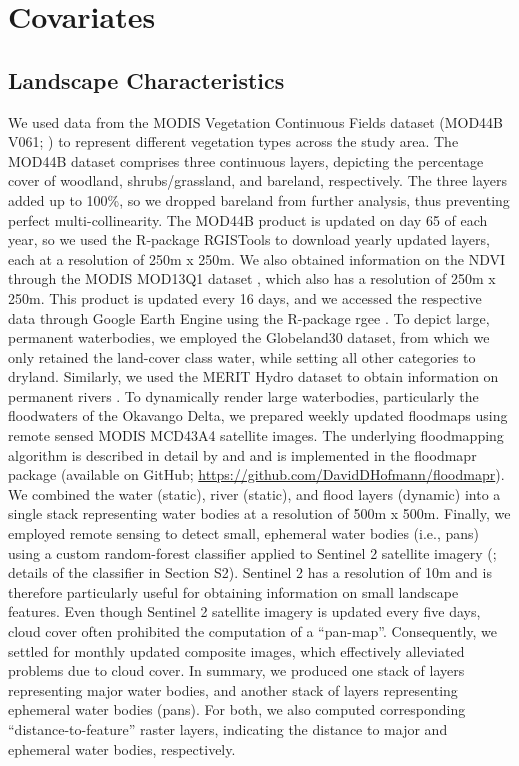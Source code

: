 \documentclass[abstract=on,10pt,a4paper,bibliography=totocnumbered]{article}
\begin{document}
\newpage
\section{Covariates}
\subsection{Landscape Characteristics}

We used data from the MODIS Vegetation Continuous Fields dataset (MOD44B V061;
\citealp{DiMiceli.2022}) to represent different vegetation types across the
study area. The MOD44B dataset comprises three continuous layers, depicting the
percentage cover of woodland, shrubs/grassland, and bareland, respectively. The
three layers added up to 100\%, so we dropped bareland from further analysis,
thus preventing perfect multi-collinearity. The MOD44B product is updated on day
65 of each year, so we used the R-package RGISTools \citep{Perez-Goya.2020} to
download yearly updated layers, each at a resolution of 250m x 250m. We also
obtained information on the NDVI through the MODIS MOD13Q1 dataset
\citep{Didan.2015}, which also has a resolution of 250m x 250m. This product is
updated every 16 days, and we accessed the respective data through Google Earth
Engine \citep{Gorelick.2017} using the R-package rgee \citep{Aybar.2024}. To
depict large, permanent waterbodies, we employed the Globeland30 dataset, from
which we only retained the land-cover class water, while setting all other
categories to dryland. Similarly, we used the MERIT Hydro dataset to obtain
information on permanent rivers \citep{Yamazaki.2019}. To dynamically render
large waterbodies, particularly the floodwaters of the Okavango Delta, we
prepared weekly updated floodmaps using remote sensed MODIS MCD43A4 satellite
images. The underlying floodmapping algorithm is described in detail by
\citet{Wolski.2017} and \citet{Hofmann.2021} and is implemented in the floodmapr
package (available on GitHub; \url{https://github.com/DavidDHofmann/floodmapr}).
We combined the water (static), river (static), and flood layers (dynamic) into
a single stack representing water bodies at a resolution of 500m x 500m.
Finally, we employed remote sensing to detect small, ephemeral water bodies
(i.e., pans) using a custom random-forest classifier applied to Sentinel 2
satellite imagery (\citealp{ESA.2025}; details of the classifier in
Section S2). Sentinel 2 has a resolution of 10m and is therefore particularly
useful for obtaining information on small landscape features. Even though
Sentinel 2 satellite imagery is updated every five days, cloud cover often
prohibited the computation of a ``pan-map''. Consequently, we settled for
monthly updated composite images, which effectively alleviated problems due to
cloud cover. In summary, we produced one stack of layers representing major
water bodies, and another stack of layers representing ephemeral water bodies
(pans). For both, we also computed corresponding ``distance-to-feature'' raster
layers, indicating the distance to major and ephemeral water bodies,
respectively.
\end{document}
